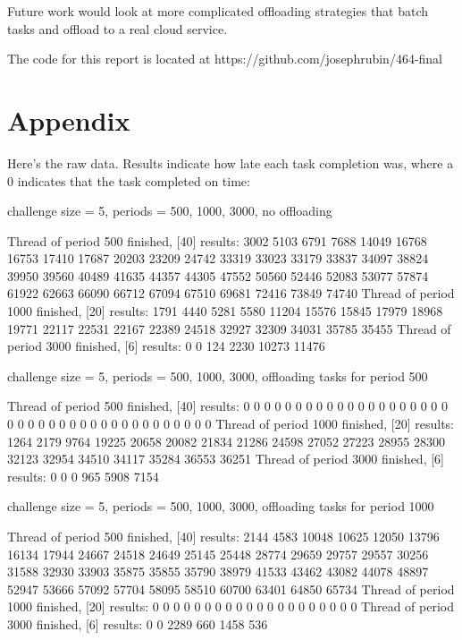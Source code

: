 \documentclass[twoside,twocolumn]{article}
\begin{document}
Future work would look at more complicated offloading strategies that batch tasks and offload to a real cloud service.

The code for this report is located at https://github.com/josephrubin/464-final





\newpage
\newpage

\section{Appendix}

Here's the raw data.
Results indicate how late each task completion was, where a 0 indicates that the task completed on time:

challenge size = 5, periods = {500, 1000, 3000}, no offloading

Thread of period 500 finished, [40] results: 3002 5103 6791 7688 14049 16768 16753 17410 17687 20203 23209 24742 33319 33023 33179 33837 34097 38824 39950 39560 40489 41635 44357 44305 47552 50560 52446 52083 53077 57874 61922 62663 66090 66712 67094 67510 69681 72416 73849 74740
Thread of period 1000 finished, [20] results: 1791 4440 5281 5580 11204 15576 15845 17979 18968 19771 22117 22531 22167 22389 24518 32927 32309 34031 35785 35455 
Thread of period 3000 finished, [6] results: 0 0 124 2230 10273 11476

challenge size = 5, periods = {500, 1000, 3000}, offloading tasks for period 500

Thread of period 500 finished, [40] results: 0 0 0 0 0 0 0 0 0 0 0 0 0 0 0 0 0 0 0 0 0 0 0 0 0 0 0 0 0 0 0 0 0 0 0 0 0 0 0 0
Thread of period 1000 finished, [20] results: 1264 2179 9764 19225 20658 20082 21834 21286 24598 27052 27223 28955 28300 32123 32954 34510 34117 35284 36553 36251
Thread of period 3000 finished, [6] results: 0 0 0 965 5908 7154

challenge size = 5, periods = {500, 1000, 3000}, offloading tasks for period 1000

Thread of period 500 finished, [40] results: 2144 4583 10048 10625 12050 13796 16134 17944 24667 24518 24649 25145 25448 28774 29659 29757 29557 30256 31588 32930 33903 35875 35855 35790 38979 41533 43462 43082 44078 48897 52947 53666 57092 57704 58095 58510 60700 63401 64850 65734
Thread of period 1000 finished, [20] results: 0 0 0 0 0 0 0 0 0 0 0 0 0 0 0 0 0 0 0 0 
Thread of period 3000 finished, [6] results: 0 0 2289 660 1458 536
\end{document}
